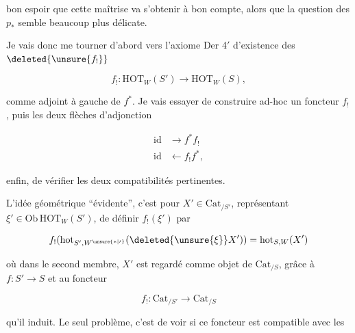 
bon espoir que cette maîtrise va s'obtenir à bon compte, alors que la question des $p_*$ semble beaucoup plus délicate.

Je vais donc me tourner d'abord vers l'axiome Der 4$'$ d'existence des $\deleted{\unsure{f_!}}$

\[
f_!:\mathrm{HOT}_W(S')\longrightarrow\mathrm{HOT}_W(S),
\]

comme adjoint à gauche de $f^*$. Je vais essayer de construire ad-hoc un foncteur $f_!$, puis  les deux flèches d'adjonction

\[
\begin{aligned}
\mathrm{id}&\longrightarrow f^* f_!\\
\mathrm{id}&\longleftarrow f_! f^*,
\end{aligned}
\]

 enfin, de vérifier les deux compatibilités pertinentes.

L'idée géométrique ``évidente'', c'est pour $X'\in\mathrm{Cat}_{/S'}$, représentant $\xi'\in\mathrm{Ob}\,\mathrm{HOT}_W(S')$, de définir $f_!(\xi')$ par

\[
f_!(\mathrm{hot}_{S',W^{\unsure{*|\prime}}}(\deleted{\unsure{\xi}}X'))=\mathrm{hot}_{S,W}(X')
\]

où dans le second membre, $X'$ est regardé comme objet de $\mathrm{Cat}_{/S}$, grâce à $f:S'\longrightarrow S$ et au foncteur

\[
f_!:\mathrm{Cat}_{/S'}\longrightarrow\mathrm{Cat}_{/S}
\]

qu'il induit. Le seul problème, c'est de voir si ce foncteur est compatible avec les
